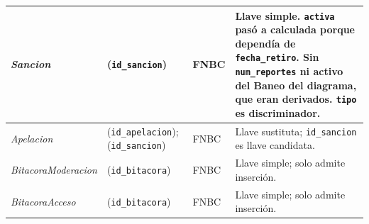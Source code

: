 \begin{center}
\begin{longtable}{|L{0.19\textwidth}|L{0.23\textwidth}|L{0.08\textwidth}|L{0.38\textwidth}|}
\textit{Sancion} & (\texttt{id\_\allowbreak{}sancion}) & FNBC & Llave simple. \texttt{activa} pasó a calculada porque dependía de \texttt{fecha\_\allowbreak{}retiro}. Sin \texttt{num\_\allowbreak{}reportes} ni activo del Baneo del diagrama, que eran derivados. \texttt{tipo} es discriminador. \\ \hline
\textit{Apelacion} & (\texttt{id\_\allowbreak{}apelacion}); (\texttt{id\_\allowbreak{}sancion}) & FNBC & Llave sustituta; \texttt{id\_\allowbreak{}sancion} es llave candidata. \\ \hline
\textit{Bitacora\-Moderacion} & (\texttt{id\_\allowbreak{}bitacora}) & FNBC & Llave simple; solo admite inserción. \\ \hline
\textit{Bitacora\-Acceso} & (\texttt{id\_\allowbreak{}bitacora}) & FNBC & Llave simple; solo admite inserción. \\ \hline
\end{longtable}
\end{center}
